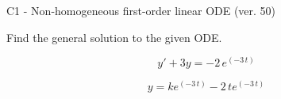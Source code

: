 \begin{exercise}
  \begin{exerciseTitle}C1 - Non-homogeneous first-order linear ODE (ver. 50)\end{exerciseTitle}
  \begin{exerciseStatement}
    
Find the general solution to the given ODE.

    
\[y'+3y= -2 \, e^{\left(-3 \, t\right)}\]

  \end{exerciseStatement}
  \begin{exerciseAnswer}
    
\[y= k e^{\left(-3 \, t\right)} - 2 \, t e^{\left(-3 \, t\right)}\]

  \end{exerciseAnswer}
\end{exercise}